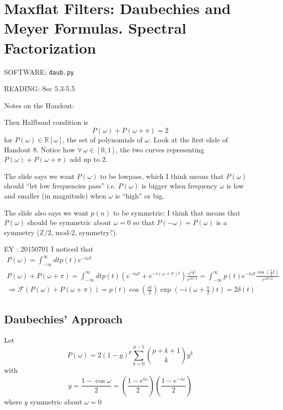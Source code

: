 \documentclass[twoside]{amsart}
\theoremstyle{plain}
\theoremstyle{definition}
\theoremstyle{remark}
\numberwithin{equation}{section}
\begin{document}
\section{Maxflat Filters: Daubechies and Meyer Formulas. Spectral Factorization}

SOFTWARE: \verb|daub.py|

READING: Sec 5.3-5.5 \cite{GStrangTNguyen1996}

Notes on the Handout:

Then Halfband condition is 
\[
P(\omega) + P(\omega + \pi) = 2
\]
for $P(\omega) \in \mathbb{R}[\omega]$, the set of polynomials of $\omega$.  Look at the first slide of Handout 8.  Notice how $\forall \, \omega \in [0,1]$, the two curves representing $P(\omega) + P(\omega + \pi)$ add up to $2$.  

The slide says we want $P(\omega)$ to be lowpass, which I think means that $P(\omega)$ should ``let low frequencies pass'' i.e. $P(\omega)$ is bigger when frequency $\omega$ is low and smaller (in magnitude) when $\omega$ is ``high'' or big.  

The slide also says we want $p(n)$ to be symmetric: I think that means that $P(\omega)$ should be symmetric about $\omega=0$ so that $P(-\omega)= P(\omega)$ is a symmetry ($\mathbb{Z}/2$, mod-2, symmetry?).  

EY : 20150701 I noticed that  
\[
\begin{gathered}
  P(\omega) = \int_{-\infty}^{\infty} dt p(t) e^{-i \omega t} \\ 
  P(\omega) + P(\omega + \pi) = \int_{-\infty}^{\infty} dt p(t) (e^{-i\omega t} + e^{-i (\omega +\pi)t} ) \frac{e^{ i \frac{\pi}{2} t} }{ e^{i \pi t/2}} = \int_{-\infty}^{\infty} p(t) e^{-i\omega t} \frac{ \cos{ \left( \frac{ \pi}{2} t \right) }}{e^{ i \pi t/2 } } \\
\Longrightarrow \mathcal{F}(P(\omega) + P(\omega + \pi) ) = p(t) \cos{\left( \frac{\pi t}{2} \right) } \exp{ (-i ( \omega + \frac{\pi}{2} ) t) } = 2\delta(t)
\end{gathered}
\]

\subsection*{Daubechies' Approach}

Let 
\begin{equation}
\boxed{  P(\omega) = 2(1-y)^p \sum_{k=0}^{p-1} \binom{ p+k+1}{k} y^k }
\end{equation}
with 
\[
y = \frac{1-\cos{\omega}}{2} = \left( \frac{1- e^{i\omega} }{2} \right)  \left( \frac{1- e^{-i\omega} }{2} \right)
\]
where $y$ symmetric about $\omega =0$
\end{document}
